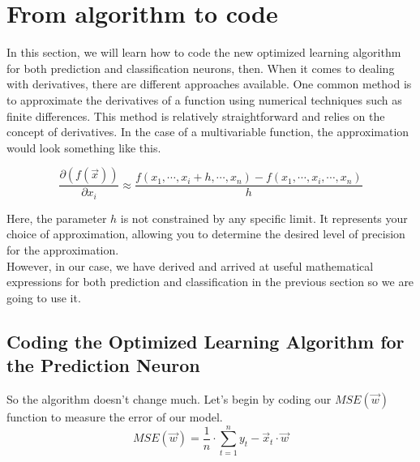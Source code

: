 \section{From algorithm to code}
In this section, we will learn how to code the new optimized learning algorithm for both prediction
and classification neurons, then. When it comes to dealing with derivatives, there are different approaches
available.
One common method is to approximate the derivatives of a function using numerical techniques such as
finite differences. This method is relatively straightforward and relies on the concept of derivatives.
In the case of a multivariable function, the approximation would look something like this.


\[
\frac{\partial (f(\vec{x}))}{\partial x_i} \approx \frac{f(x_1, \cdots, x_i + h, \cdots, x_n) -
  f(x_1, \cdots, x_i, \cdots, x_n)}{h}
\]

Here, the parameter $h$ is not constrained by any specific limit. It represents your choice of
approximation, allowing you to determine the desired level of precision for the approximation.\\

However, in our case, we have derived and arrived at useful mathematical expressions
for both prediction and classification in the previous section so we are going to use it.

\subsection{Coding the Optimized Learning Algorithm for the Prediction Neuron}
So the algorithm doesn't change much. Let's begin by coding our $MSE(\vec{w})$ function to measure
the error of our model.
\[
MSE(\vec{w}) = \frac{1}{n} \cdot \sum_{t = 1}^ny_t - \vec{x}_t \cdot \vec{w}
\]

